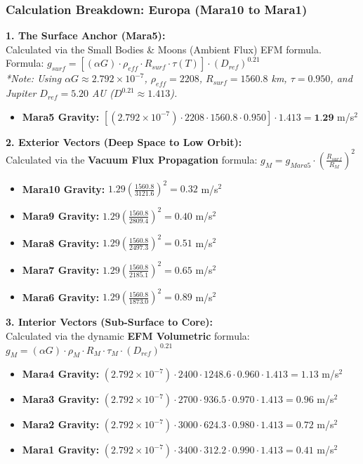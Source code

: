 \documentclass[11pt, a4paper]{article}
\begin{document}
\clearpage
\subsubsection{Calculation Breakdown: Europa (Mara10 to Mara1)}

\noindent \textbf{1. The Surface Anchor (Mara5):} \\
Calculated via the Small Bodies \& Moons (Ambient Flux) EFM formula. \\
Formula: $g_{surf} = \left[ (\alpha G) \cdot \rho_{eff} \cdot R_{surf} \cdot \tau(T) \right] \cdot (D_{ref})^{0.21}$ \\
\textit{*Note: Using $\alpha G \approx 2.792 \times 10^{-7}$, $\rho_{eff} = 2208$, $R_{surf} = 1560.8$ km, $\tau = 0.950$, and Jupiter $D_{ref} = 5.20$ AU ($D^{0.21} \approx 1.413$).}
\begin{itemize}
  \item \textbf{Mara5 Gravity:} $\left[ (2.792 \times 10^{-7}) \cdot 2208 \cdot 1560.8 \cdot 0.950 \right] \cdot 1.413 = \textbf{1.29}$ m/s$^2$
\end{itemize}

\vspace{0.5em}
\noindent \textbf{2. Exterior Vectors (Deep Space to Low Orbit):} \\
Calculated via the \textbf{Vacuum Flux Propagation} formula: $g_M = g_{Mara5} \cdot \left( \frac{R_{surf}}{R_M} \right)^2$
\begin{itemize}
  \item \textbf{Mara10 Gravity:} $1.29 \left( \frac{1560.8}{3121.6} \right)^2 = 0.32$ m/s$^2$
  \item \textbf{Mara9 Gravity:} $1.29 \left( \frac{1560.8}{2809.4} \right)^2 = 0.40$ m/s$^2$
  \item \textbf{Mara8 Gravity:} $1.29 \left( \frac{1560.8}{2497.3} \right)^2 = 0.51$ m/s$^2$
  \item \textbf{Mara7 Gravity:} $1.29 \left( \frac{1560.8}{2185.1} \right)^2 = 0.65$ m/s$^2$
  \item \textbf{Mara6 Gravity:} $1.29 \left( \frac{1560.8}{1873.0} \right)^2 = 0.89$ m/s$^2$
\end{itemize}

\vspace{0.5em}
\noindent \textbf{3. Interior Vectors (Sub-Surface to Core):} \\
Calculated via the dynamic \textbf{EFM Volumetric} formula: $g_M = (\alpha G) \cdot \rho_{M} \cdot R_M \cdot \tau_M \cdot (D_{ref})^{0.21}$
\begin{itemize}
  \item \textbf{Mara4 Gravity:} $(2.792 \times 10^{-7}) \cdot 2400 \cdot 1248.6 \cdot 0.960 \cdot 1.413 = 1.13$ m/s$^2$
  \item \textbf{Mara3 Gravity:} $(2.792 \times 10^{-7}) \cdot 2700 \cdot 936.5 \cdot 0.970 \cdot 1.413 = 0.96$ m/s$^2$
  \item \textbf{Mara2 Gravity:} $(2.792 \times 10^{-7}) \cdot 3000 \cdot 624.3 \cdot 0.980 \cdot 1.413 = 0.72$ m/s$^2$
  \item \textbf{Mara1 Gravity:} $(2.792 \times 10^{-7}) \cdot 3400 \cdot 312.2 \cdot 0.990 \cdot 1.413 = 0.41$ m/s$^2$
\end{itemize}
\end{document}
